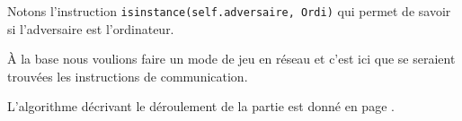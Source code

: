 Notons l'instruction \texttt{isinstance(self.adversaire, Ordi)} qui permet de savoir si l'adversaire est l'ordinateur.

\medskip

À la base nous voulions faire un mode de jeu en réseau et c'est ici que se seraient trouvées les instructions de communication.

\medskip

L'algorithme décrivant le déroulement de la partie est donné en page \pageref{algo_partie}.

%
